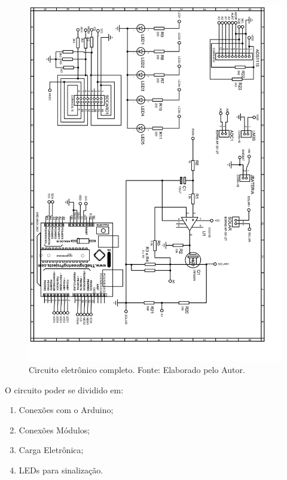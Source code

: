\FloatBarrier
\begin{figure}[!htbp]
	\centering
	\includegraphics[scale=0.3]{PDFs/AllComponents-rotated-1.png}
	\caption{Circuito eletrônico completo. Fonte: Elaborado pelo Autor. 	}
	\label{fig:Circuito}
\end{figure}
\FloatBarrier

O circuito poder se dividido em:
\begin{enumerate}
	\item Conexões com o Arduino;
	\item Conexões Módulos;
	\item Carga Eletrônica;
	\item LEDs para sinalização.
\end{enumerate}

